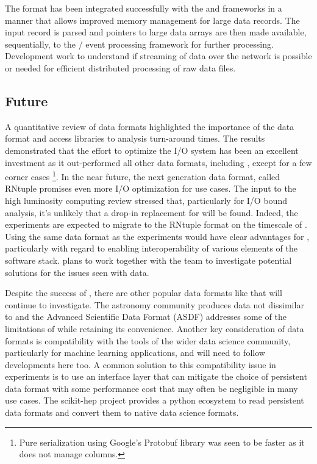 \documentclass[../main-v1.tex]{subfiles}
\begin{document}
The  format has been integrated successfully with the  and  frameworks in a manner that allows improved memory management for large data records.  The  input  record is parsed and pointers to large data arrays are then made available, sequentially, to the / event processing framework for further processing. Development work to understand if streaming of  data over the network is possible or needed for efficient distributed processing of raw data files.

\subsection{Future }
A quantitative review of data formats \cite{Blomer:2018icl} 
highlighted the importance of the data format and access libraries to analysis turn-around times.  The results demonstrated that the effort to optimize the  I/O system has been an excellent investment as it out-performed all other data formats, including , except for a few corner cases
\footnote{Pure serialization using Google's Protobuf library was seen to be faster as it does not manage columns.}.
In the near future, the next generation  data format, called RNtuple 
\cite{Blomer:2020usr, ROOTTeam:2020jal} promises even more I/O optimization for  use cases.  The  input to the high luminosity  computing review \cite{HEPSoftwareFoundation:2020daq} stressed that, particularly for I/O bound analysis, it's unlikely that a drop-in replacement for  will be found.
Indeed, the  experiments are expected to migrate to the RNtuple format on the timescale of .  Using the same data format as the  experiments would have clear advantages for , particularly with regard to enabling interoperability of various elements of the software stack.  plans to work together with the  team to investigate potential solutions for the issues seen with  data.

Despite the success of , there are other popular data formats like  that  will continue to investigate.  The astronomy community produces data not dissimilar to  and the Advanced Scientific Data Format (ASDF) addresses some of the limitations of  while retaining its convenience. Another key consideration of data formats is compatibility with the tools of the wider data science community, particularly for machine learning applications, and  will need to follow developments here too.  A common solution to this compatibility issue in  experiments is to use an interface layer that can mitigate the choice of persistent data format with some performance cost that may often be negligible in many use cases.  The scikit-hep project\cite{Rodrigues:2019nct} provides a python ecosystem to read  persistent data formats and convert them to native data science formats.
\end{document}
